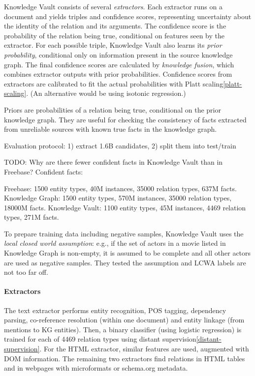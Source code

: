 Knowledge Vault consists of several \textit{extractors}. Each extractor runs on a
document and yields triples and confidence scores, representing uncertainty
about the identity of the relation and its arguments. The confidence score is
the probability of the relation being true, conditional on features seen by
the extractor.
For each possible triple, Knowledge Vault also learns its \textit{prior
probability}, conditional only on information present in the source knowledge
graph.
The final confidence scores are calculated by \textit{knowledge fusion},
which combines extractor outputs with prior probabilities.
Confidence scores from extractors are calibrated to fit the actual probabilities
with Platt scaling\ref{platt-scaling}.
(An alternative would be using isotonic regression.)

Priors are probabilities of a relation being true, conditional
on the prior knowledge graph. They are useful for checking the consistency of
facts extracted from unreliable sources with known true facts in the knowledge
graph.

Evaluation protocol: 1) extract 1.6B candidates, 2) split them into test/train

TODO: Why are there fewer confident facts in Knowledge Vault than in Freebase?
Confident facts:

Freebase: 1500 entity types, 40M instances, 35000 relation types, 637M
facts.
Knowledge Graph: 1500 entity types, 570M instances, 35000 relation types, 18000M
facts.
Knowledge Vault: 1100 entity types, 45M instances, 4469 relation types, 271M
facts.

To prepare training data including negative samples, Knowledge Vault uses the
\textit{local closed world assumption}: e.g., if the set of actors in a movie listed
in Knowledge Graph is non-empty, it is assumed to be complete and all other
actors are used as negative samples.
They tested the assumption and LCWA labels are not too far off.

\paragraph{Extractors}
The text extractor performs entity recognition, POS tagging, dependency parsing,
co-reference resolution (within one document) and entity linkage (from mentions
to KG entities).
Then, a binary classifier (using logistic regression) is trained for each of
4469 relation types using distant supervision\ref{distant-supervision}.
For the HTML extractor, similar features are used, augmented with DOM
information.
The remaining two extractors find relations in HTML tables and in webpages
with microformats or schema.org metadata.


